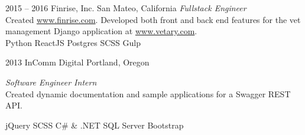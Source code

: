 \documentclass[]{friggeri-cv} %
\begin{document}
\begin{entrylist}
\entry
{2015 -- 2016}
{Finrise, Inc.}
{San Mateo, California}
{\emph{Fullstack Engineer} \\
Created \href{https://www.finrise.com}{www.finrise.com}.
Developed both front and back end features for the vet management Django application at \href{https://www.vetary.com}{www.vetary.com}.\\
Python \mydot ReactJS \mydot Postgres \mydot SCSS \mydot Gulp}

%
%

\entry
{2013}
{InComm Digital}
{Portland, Oregon}
{\emph{Software Engineer Intern} \\
Created dynamic documentation and sample applications for a Swagger REST API.

jQuery \mydot SCSS \mydot C\# \& .NET \mydot SQL Server \mydot Bootstrap }


\end{entrylist}
\end{document}
